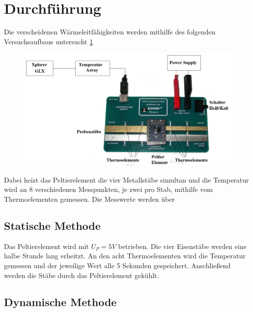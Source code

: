 \section{Durchführung}
\label{sec:Durchführung}
Die verscheidenen Wärmeleitfähigkeiten werden mithilfe des folgenden Versuchsaufbaus
untersucht \ref{fig:aufbau}
\begin{figure}
\centering
\includegraphics{content/aufbau.png}
\label{fig:aufbau}
\end{figure}
Dabei heizt das Peltierelement die vier Metallstäbe simultan und die Temperatur wird an 8
verschiedenen Messpunkten, je zwei pro Stab, mithilfe vom Thermoelementen gemessen. Die
Messwerte werden über

\subsection{Statische Methode}
\label{sec:statische Methode}
Das Peltierelement wird mit $U_P=5V$ betrieben.
Die vier Eisenstäbe werden eine halbe Stunde lang erheitzt.
An den acht Thermoelementen wird die Temperatur gemessen und der jeweilige Wert alle 5 Sekunden gespeichert.
Anschließend werden die Stäbe durch das Peltierelement gekühlt.


\subsection{Dynamische Methode}
\label{sec:dynamische Methode}
